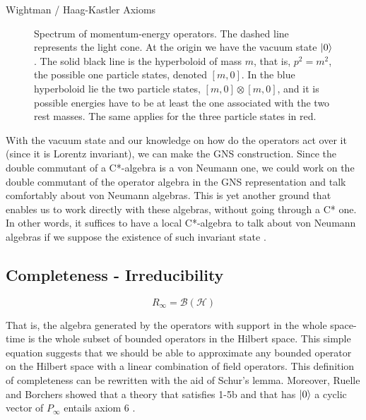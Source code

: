 \documentclass[12pt]{article}
\begin{document}
\begin{section}{Wightman / Haag-Kastler Axioms}
\begin{figure}[H]
\centering
{}
\caption{Spectrum of momentum-energy operators. The dashed line represents the light cone. At the origin we have the vacuum state $\ket{0}$. The solid black line is the hyperboloid of mass $m$, that is, $p^2 = m^2$, the possible one particle states, denoted $[m,0]$. In the blue hyperboloid lie the two particle states, $[m,0] \otimes [m,0]$, and it is possible energies have to be at least the one associated with the two rest masses. The same applies for the three particle states in red. \cite{streater_pct_1989}} 
\label{spec}
\end{figure}

With the vacuum state and our knowledge on how do the operators act over it (since it is Lorentz invariant), we can make the GNS construction. Since the double commutant of a C*-algebra is a von Neumann one, we could work on the double commutant of the operator algebra in the GNS representation and talk comfortably about von Neumann algebras. This is yet another ground that enables us to work directly with these algebras, without going through a C* one. In other words, it suffices to have a local C*-algebra to talk about von Neumann algebras if we suppose the existence of such invariant state \cite{redei_is_1996}.

\subsection{Completeness - Irreducibility}

\begin{equation}
R_{\infty} = \mathcal{B} (\mathcal{H})
\end{equation}

That is, the algebra generated by the operators with support in the whole space-time is the whole subset of bounded operators in the Hilbert space. This simple equation suggests that we should be able to approximate any bounded operator on the Hilbert space with a linear combination of field operators. This definition of completeness can be rewritten with the aid of Schur's lemma. Moreover, Ruelle and Borchers showed that a theory that satisfies 1-5b and that has $\ket{0}$ a cyclic vector of $P_{\infty}$ entails axiom 6 \cite{haag_postulates_1962}.


\end{section}
\end{document}
